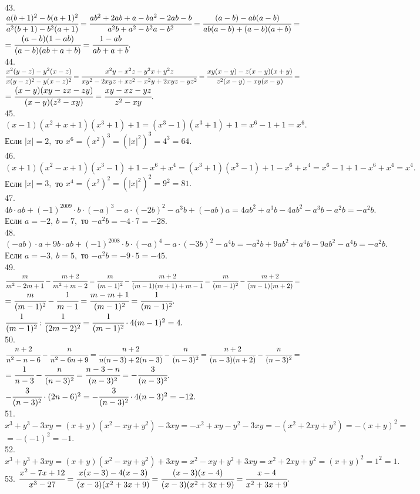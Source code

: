 \documentclass[12pt]{article}
\begin{document}
43. $\cfrac{a(b+1)^2-b(a+1)^2}{a^2(b+1)-b^2(a+1)}=\cfrac{ab^2+2ab+a-ba^2-2ab-b}{a^2b+a^2-b^2a-b^2}=\cfrac{(a-b)-ab(a-b)}{ab(a-b)+(a-b)(a+b)}=$\\$=
\cfrac{(a-b)(1-ab)}{(a-b)(ab+a+b)}=\cfrac{1-ab}{ab+a+b}.$\\
44. $\cfrac{x^2(y-z)-y^2(x-z)}{x(y-z)^2-y(x-z)^2}=\cfrac{x^2y-x^2z-y^2x+y^2z}{xy^2-2xyz+xz^2-x^2y+2xyz-yz^2}=
\cfrac{xy(x-y)-z(x-y)(x+y)}{z^2(x-y)-xy(x-y)}=$\\$=\cfrac{(x-y)(xy-zx-zy)}{(x-y)(z^2-xy)}=\cfrac{xy-xz-yz}{z^2-xy}.$\\
45. $(x-1)(x^2+x+1)(x^3+1)+1=(x^3-1)(x^3+1)+1=x^6-1+1=x^6.$ Если $|x|=2,$ то $x^6=(x^2)^3=(|x|^2)^3=4^3=64.$\\
46. $(x+1)(x^2-x+1)(x^3-1)+1-x^6+x^4=(x^3+1)(x^3-1)+1-x^6+x^4=x^6-1+1-x^6+x^4=x^4.$ Если $|x|=3,$ то $x^4=(x^2)^2=(|x|^2)^2=9^2=81.$\\
47. $4b\cdot ab+(-1)^{2009}\cdot b\cdot(-a)^3-a\cdot(-2b)^2-a^3b+(-ab)a=4ab^2+a^3b-4ab^2-a^3b-a^2b=-a^2b.$ Если $a=-2,\ b=7,$ то
$-a^2b=-4\cdot7=-28.$\\
48. $(-ab)\cdot a+9b\cdot ab+(-1)^{2008}\cdot b\cdot(-a)^4-a\cdot (-3b)^2-a^4b=-a^2b+9ab^2+a^4b-9ab^2-a^4b=-a^2b.$ Если $a=-3,\ b=5,$ то
$-a^2b=-9\cdot5=-45.$\\
49. $\cfrac{m}{m^2-2m+1}-\cfrac{m+2}{m^2+m-2}=\cfrac{m}{(m-1)^2}-\cfrac{m+2}{(m-1)(m+1)+m-1}=
\cfrac{m}{(m-1)^2}-\cfrac{m+2}{(m-1)(m+2)}=$\\$=\cfrac{m}{(m-1)^2}-\cfrac{1}{m-1}=\cfrac{m-m+1}{(m-1)^2}=\cfrac{1}{(m-1)^2}.$\\
$\cfrac{1}{(m-1)^2}:\cfrac{1}{(2m-2)^2}=\cfrac{1}{(m-1)^2}\cdot4(m-1)^2=4.$\\
50. $\cfrac{n+2}{n^2-n-6}-\cfrac{n}{n^2-6n+9}=\cfrac{n+2}{n(n-3)+2(n-3)}-\cfrac{n}{(n-3)^2}=\cfrac{n+2}{(n-3)(n+2)}-\cfrac{n}{(n-3)^2}=$\\
$=\cfrac{1}{n-3}-\cfrac{n}{(n-3)^2}=\cfrac{n-3-n}{(n-3)^2}=-\cfrac{3}{(n-3)^2}.$\\
$-\cfrac{3}{(n-3)^2}\cdot(2n-6)^2=-\cfrac{3}{(n-3)^2}\cdot4(n-3)^2=-12.$\\
51. $x^3+y^3-3xy=(x+y)(x^2-xy+y^2)-3xy=-x^2+xy-y^2-3xy=-(x^2+2xy+y^2)=-(x+y)^2=$\\$=-(-1)^2=-1.$\\
52. $x^3+y^3+3xy=(x+y)(x^2-xy+y^2)+3xy=x^2-xy+y^2+3xy=x^2+2xy+y^2=(x+y)^2=1^2=1.$\\
53. $\cfrac{x^2-7x+12}{x^3-27}=\cfrac{x(x-3)-4(x-3)}{(x-3)(x^2+3x+9)}=\cfrac{(x-3)(x-4)}{(x-3)(x^2+3x+9)}=\cfrac{x-4}{x^2+3x+9}.$\\
\end{document}
